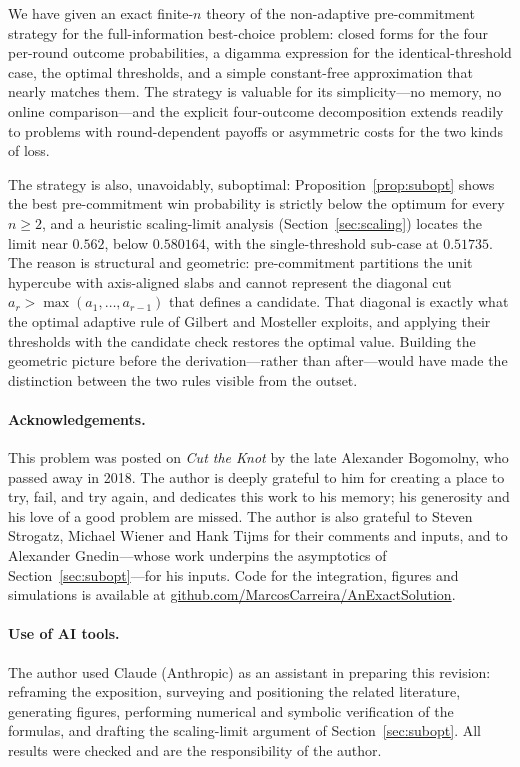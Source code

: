 \documentclass[11pt]{article}
\newcommand{\amax}{\operatorname{max}}
\begin{document}
We have given an exact finite-$n$ theory of the non-adaptive pre-commitment strategy
for the full-information best-choice problem: closed forms for the four per-round
outcome probabilities, a digamma expression for the identical-threshold case, the
optimal thresholds, and a simple constant-free approximation that nearly matches them.
The strategy is valuable for its simplicity---no memory, no online comparison---and the
explicit four-outcome decomposition extends readily to problems with round-dependent
payoffs or asymmetric costs for the two kinds of loss.

The strategy is also, unavoidably, suboptimal: Proposition~\ref{prop:subopt} shows the
best pre-commitment win probability is strictly below the optimum for every $n\ge2$, and a
heuristic scaling-limit analysis (Section~\ref{sec:scaling}) locates the limit near
$0.562$, below $0.580164$, with the single-threshold sub-case at $0.51735$. The reason is
structural and geometric:
pre-commitment partitions the
unit hypercube with axis-aligned slabs and cannot represent the diagonal cut
$a_r>\amax(a_1,\dots,a_{r-1})$ that defines a candidate. That diagonal is exactly what
the optimal adaptive rule of Gilbert and Mosteller exploits, and applying their
thresholds with the candidate check restores the optimal value. Building the
geometric picture before the derivation---rather than after---would have made the
distinction between the two rules visible from the outset.

\paragraph{Acknowledgements.} This problem was posted on \emph{Cut the Knot} by the late
Alexander Bogomolny, who passed away in 2018. The author is deeply grateful to him for
creating a place to try, fail, and try again, and dedicates this work to his memory; his
generosity and his love of a good problem are missed. The author is also grateful to
Steven Strogatz, Michael Wiener and Hank Tijms for their comments and inputs, and to
Alexander Gnedin---whose work
\cite{Gnedin1996,GnedinMiretskiy2007} underpins the asymptotics of
Section~\ref{sec:subopt}---for his inputs. Code for the integration, figures and
simulations is available at
\href{https://github.com/MarcosCarreira/AnExactSolution}{github.com/MarcosCarreira/AnExactSolution}.

\paragraph{Use of AI tools.} The author used Claude (Anthropic) as an assistant in
preparing this revision: reframing the exposition, surveying and positioning the related
literature, generating figures, performing numerical and symbolic verification of the
formulas, and drafting the scaling-limit argument of Section~\ref{sec:subopt}. All
results were checked and are the responsibility of the author.
\end{document}
